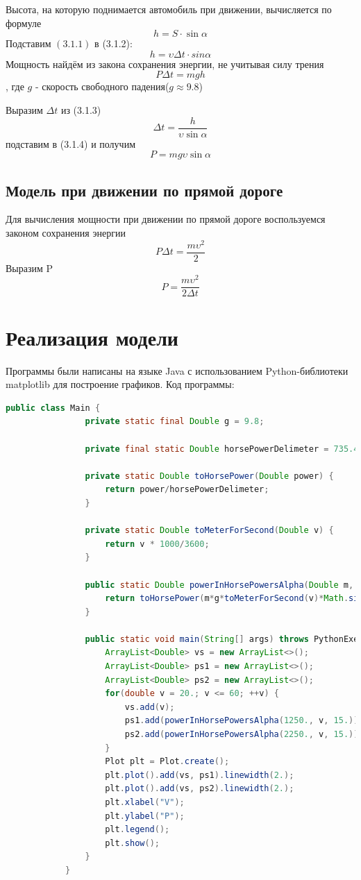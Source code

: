\documentclass[a4paper, 14pt]{extarticle}
\begin{document}
			Высота, на которую поднимается автомобиль при движении, вычисляется по формуле
			\[ h = S \cdot \sin{\alpha} \tag{3.1.2} \label{eq:special}\]
			Подставим \( (3.1.1) \) в (3.1.2):
			\[ h = \upsilon \Delta t \cdot sin{\alpha}  \tag{3.1.3} \label{eq:special} \]
			Мощность найдём из закона сохранения энергии, не учитывая силу трения
			\[ P \Delta t = mgh  \tag{3.1.4} \label{eq:special}\]
			, где \( g \) - скорость свободного падения(\( g \approx 9.8 \))
			
			Выразим \( \Delta t\) из (3.1.3)
			\[ \Delta t = \dfrac{h}{\upsilon \sin{\alpha}} \]
			подставим в (3.1.4) и получим
			\[ P = mg \upsilon \sin{\alpha} \]
		\subsection{Модель при движении по прямой дороге}
			Для вычисления мощности при движении по прямой дороге воспользуемся
			законом сохранения энергии
			\[ P \Delta t = \dfrac{m\upsilon^2}{2} \]
			Выразим P
			\[ P = \dfrac{m\upsilon^2}{2\Delta t} \]
	
	\section{Реализация модели}
		Программы были написаны на языке Java с использованием Python-библиотеки matplotlib для построение графиков.
						Код программы:
		\begin{lstlisting}[language=Java]
			public class Main {
				private static final Double g = 9.8;
				
				private final static Double horsePowerDelimeter = 735.499;
				
				private static Double toHorsePower(Double power) {
					return power/horsePowerDelimeter;
				}
				
				private static Double toMeterForSecond(Double v) {
					return v * 1000/3600;
				}
				
				public static Double powerInHorsePowersAlpha(Double m, Double v, Double alpha) {
					return toHorsePower(m*g*toMeterForSecond(v)*Math.sin(Math.toRadians(alpha)));
				}
				
				public static void main(String[] args) throws PythonExecutionException, IOException {
					ArrayList<Double> vs = new ArrayList<>();
					ArrayList<Double> ps1 = new ArrayList<>();
					ArrayList<Double> ps2 = new ArrayList<>();
					for(double v = 20.; v <= 60; ++v) {
						vs.add(v);
						ps1.add(powerInHorsePowersAlpha(1250., v, 15.));
						ps2.add(powerInHorsePowersAlpha(2250., v, 15.));
					}
					Plot plt = Plot.create();
					plt.plot().add(vs, ps1).linewidth(2.);
					plt.plot().add(vs, ps2).linewidth(2.);
					plt.xlabel("V");
					plt.ylabel("P");
					plt.legend();
					plt.show();
				}
			}
		\end{lstlisting}
		\pagebreak
\end{document}

